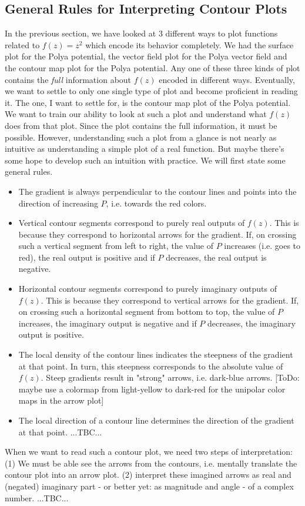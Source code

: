 \documentclass[12pt]{article}
\begin{document}
\subsection{General Rules for Interpreting Contour Plots}
In the previous section, we have looked at 3 different ways to plot functions related to $f(z) = z^2$ which encode its behavior completely. We had the surface plot for the Polya potential, the vector field plot for the Polya vector field and the contour map plot for the Polya potential. Any one of these three kinds of plot contains the \emph{full} information about $f(z)$ encoded in different ways. Eventually, we want to settle to only one single type of plot and become proficient in reading it. The one, I want to settle for, is the contour map plot of the Polya potential. We want to train our ability to look at such a plot and understand what $f(z)$ does from that plot. Since the plot contains the full information, it must be possible. However, understanding such a plot from a glance is not nearly as intuitive as understanding a simple plot of a real function. But maybe there's some hope to develop such an intuition with practice. We will first state some general rules.
\begin{itemize}
\item The gradient is always perpendicular to the contour lines and points into the direction of increasing $P$, i.e. towards the red colors.
\item Vertical contour segments correspond to purely real outputs of $f(z)$. This is because they correspond to horizontal arrows for the gradient. If, on crossing such a vertical segment from left to right, the value of $P$ increases (i.e. goes to red), the real output is positive and if $P$ decreases, the real output is negative.
\item Horizontal contour segments correspond to purely imaginary outputs of $f(z)$. This is because they correspond to vertical arrows for the gradient. If, on crossing such a horizontal segment from bottom to top, the value of $P$ increases, the imaginary output is negative and if $P$ decreases, the imaginary output is positive.
\item The local density of the contour lines indicates the steepness of the gradient at that point. In turn, this steepness corresponds to the absolute value of $f(z)$. Steep gradients result in "strong" arrows, i.e. dark-blue arrows. [ToDo: maybe use a colormap from light-yellow to dark-red for the unipolar color maps in the arrow plot]
\item The local direction of a contour line determines the direction of the gradient at that point. ...TBC...
\end{itemize}
When we want to read such a contour plot, we need two steps of interpretation: (1) We must be able see the arrows from the contours, i.e. mentally translate the contour plot into an arrow plot. (2) interpret these imagined arrows as real and (negated) imaginary part - or better yet: as magnitude and angle - of a complex number. ...TBC...
\end{document}
